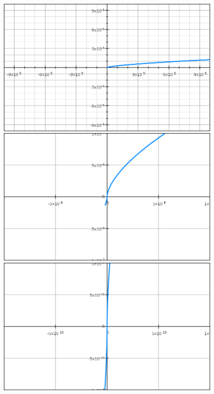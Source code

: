 \documentclass{beamer}
\begin{document}
\begin{frame}
\begin{columns}
\begin{column}{0.5\textwidth}
\begin{figure}
\begin{overprint}
						\includegraphics[width=\textwidth]{pres_img/f4.png}
						\onslide<6>\includegraphics[width=\textwidth]{pres_img/f5.png}
						\onslide<7->\includegraphics[width=\textwidth]{pres_img/f6.png}
					\end{overprint}
				\end{figure}
			\end{column}
		\end{columns}
	\end{frame}
	
\end{document}
